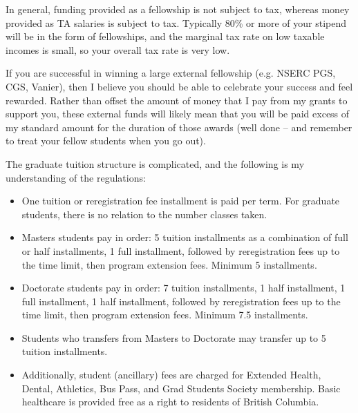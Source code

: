 \documentclass[11pt]{article}
\begin{document}
In general, funding provided as a fellowship is not subject to tax, whereas money provided as TA salaries is subject to tax.
Typically 80\% or more of your stipend will be in the form of fellowships, and the marginal tax rate on low taxable incomes is small, so your overall tax rate is very low.

If you are successful in winning a large external fellowship (e.g. NSERC PGS, CGS, Vanier), then I believe you should be able to celebrate your success and feel rewarded.
Rather than offset the amount of money that I pay from my grants to support you, these external funds will likely mean that you will be paid excess of my standard amount for the duration of those awards (well done – and remember to treat your fellow students when you go out).

The graduate tuition structure is complicated, and the following is my understanding of the regulations:
\begin{itemize}
	\itemsep0em
	\item One tuition or reregistration fee installment is paid per term. For graduate students, there is no relation to the number classes taken.
	\item Masters students pay in order: 5 tuition installments as a combination of full or half installments, 1 full installment, followed by reregistration fees up to the time limit, then program extension fees. Minimum 5 installments.
	\item Doctorate students pay in order: 7 tuition installments, 1 half installment, 1 full installment, 1 half installment, followed by reregistration fees up to the time limit, then program extension fees. Minimum 7.5 installments.
	\item Students who transfers from Masters to Doctorate may transfer up to 5 tuition installments.
	\item Additionally, student (ancillary) fees are charged for Extended Health, Dental, Athletics, Bus Pass, and Grad Students Society membership. Basic healthcare is provided free as a right to residents of British Columbia.
\end{itemize}
\end{document}

